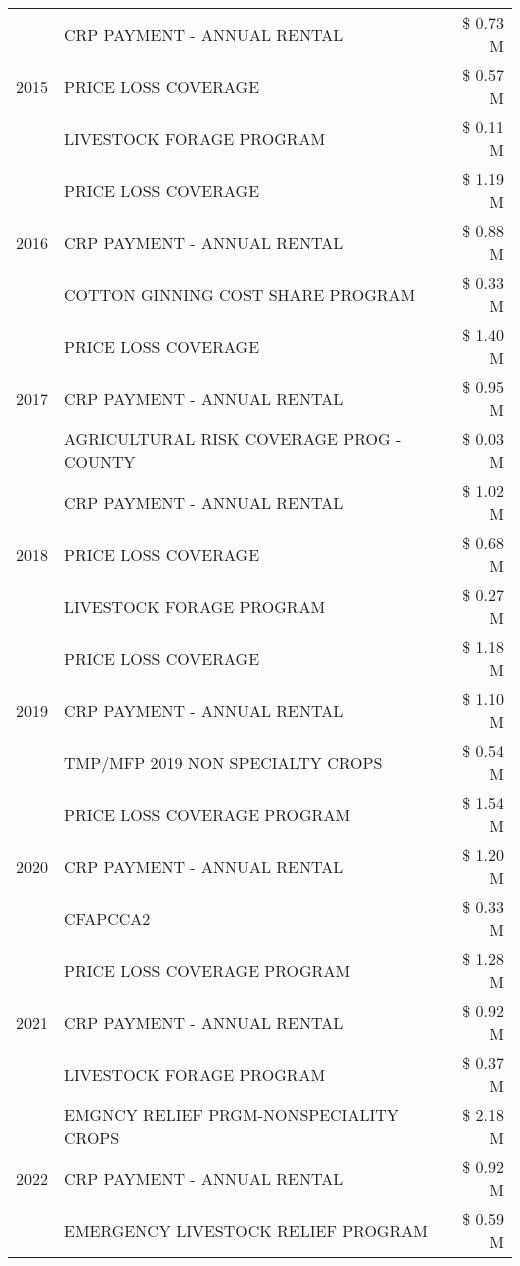 \begin{tabular}{llr}
\multirow[t]{3}{*}{2015} & CRP PAYMENT - ANNUAL RENTAL & \$ 0.73 M \\
 & PRICE LOSS COVERAGE & \$ 0.57 M \\
 & LIVESTOCK FORAGE PROGRAM & \$ 0.11 M \\
\cline{1-3}
\multirow[t]{3}{*}{2016} & PRICE LOSS COVERAGE & \$ 1.19 M \\
 & CRP PAYMENT - ANNUAL RENTAL & \$ 0.88 M \\
 & COTTON GINNING COST SHARE PROGRAM & \$ 0.33 M \\
\cline{1-3}
\multirow[t]{3}{*}{2017} & PRICE LOSS COVERAGE & \$ 1.40 M \\
 & CRP PAYMENT - ANNUAL RENTAL & \$ 0.95 M \\
 & AGRICULTURAL RISK COVERAGE PROG - COUNTY & \$ 0.03 M \\
\cline{1-3}
\multirow[t]{3}{*}{2018} & CRP PAYMENT - ANNUAL RENTAL & \$ 1.02 M \\
 & PRICE LOSS COVERAGE & \$ 0.68 M \\
 & LIVESTOCK FORAGE PROGRAM & \$ 0.27 M \\
\cline{1-3}
\multirow[t]{3}{*}{2019} & PRICE LOSS COVERAGE & \$ 1.18 M \\
 & CRP PAYMENT - ANNUAL RENTAL & \$ 1.10 M \\
 & TMP/MFP 2019 NON SPECIALTY CROPS & \$ 0.54 M \\
\cline{1-3}
\multirow[t]{3}{*}{2020} & PRICE LOSS COVERAGE PROGRAM & \$ 1.54 M \\
 & CRP PAYMENT - ANNUAL RENTAL & \$ 1.20 M \\
 & CFAPCCA2 & \$ 0.33 M \\
\cline{1-3}
\multirow[t]{3}{*}{2021} & PRICE LOSS COVERAGE PROGRAM & \$ 1.28 M \\
 & CRP PAYMENT - ANNUAL RENTAL & \$ 0.92 M \\
 & LIVESTOCK FORAGE PROGRAM & \$ 0.37 M \\
\cline{1-3}
\multirow[t]{3}{*}{2022} & EMGNCY RELIEF PRGM-NONSPECIALITY CROPS & \$ 2.18 M \\
 & CRP PAYMENT - ANNUAL RENTAL & \$ 0.92 M \\
 & EMERGENCY LIVESTOCK RELIEF PROGRAM & \$ 0.59 M \\
\cline{1-3}
\bottomrule
\end{tabular}
